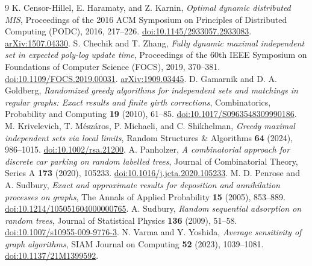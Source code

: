 \documentclass[11pt]{article}
\begin{document}
\begin{thebibliography}{9}
 K. Censor-Hillel, E. Haramaty, and Z. Karnin, \emph{Optimal dynamic distributed MIS}, Proceedings of the 2016 ACM Symposium on Principles of Distributed Computing (PODC), 2016, 217--226. \href{https://doi.org/10.1145/2933057.2933083}{doi:10.1145/2933057.2933083}. \href{https://arxiv.org/abs/1507.04330}{arXiv:1507.04330}.
 S. Chechik and T. Zhang, \emph{Fully dynamic maximal independent set in expected poly-log update time}, Proceedings of the 60th IEEE Symposium on Foundations of Computer Science (FOCS), 2019, 370--381. \href{https://doi.org/10.1109/FOCS.2019.00031}{doi:10.1109/FOCS.2019.00031}. \href{https://arxiv.org/abs/1909.03445}{arXiv:1909.03445}.
 D. Gamarnik and D. A. Goldberg, \emph{Randomized greedy algorithms for independent sets and matchings in regular graphs: Exact results and finite girth corrections}, Combinatorics, Probability and Computing \textbf{19} (2010), 61--85. \href{https://doi.org/10.1017/S0963548309990186}{doi:10.1017/S0963548309990186}.
 M. Krivelevich, T. M\'esz\'aros, P. Michaeli, and C. Shikhelman, \emph{Greedy maximal independent sets via local limits}, Random Structures \& Algorithms \textbf{64} (2024), 986--1015. \href{https://doi.org/10.1002/rsa.21200}{doi:10.1002/rsa.21200}.
 A. Panholzer, \emph{A combinatorial approach for discrete car parking on random labelled trees}, Journal of Combinatorial Theory, Series A \textbf{173} (2020), 105233. \href{https://doi.org/10.1016/j.jcta.2020.105233}{doi:10.1016/j.jcta.2020.105233}.
 M. D. Penrose and A. Sudbury, \emph{Exact and approximate results for deposition and annihilation processes on graphs}, The Annals of Applied Probability \textbf{15} (2005), 853--889. \href{https://doi.org/10.1214/105051604000000765}{doi:10.1214/105051604000000765}.
 A. Sudbury, \emph{Random sequential adsorption on random trees}, Journal of Statistical Physics \textbf{136} (2009), 51--58. \href{https://doi.org/10.1007/s10955-009-9776-3}{doi:10.1007/s10955-009-9776-3}.
 N. Varma and Y. Yoshida, \emph{Average sensitivity of graph algorithms}, SIAM Journal on Computing \textbf{52} (2023), 1039--1081. \href{https://doi.org/10.1137/21M1399592}{doi:10.1137/21M1399592}.
\end{thebibliography}
\end{document}
